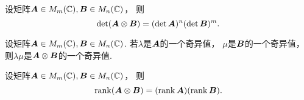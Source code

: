\begin{property}
设矩阵\(\boldsymbol{A} \in M_m(\mathbb{C}),
\boldsymbol{B} \in M_n(\mathbb{C})\)，
则\begin{equation}
	\det(
		\boldsymbol{A}\otimes\boldsymbol{B}
	)
	= (\det\boldsymbol{A})^n (\det\boldsymbol{B})^m.
\end{equation}
\end{property}

\begin{property}
设矩阵\(\boldsymbol{A} \in M_m(\mathbb{C}),
\boldsymbol{B} \in M_n(\mathbb{C})\).
若\(\lambda\)是\(\boldsymbol{A}\)的一个奇异值，
\(\mu\)是\(\boldsymbol{B}\)的一个奇异值，
则\(\lambda\mu\)是\(\boldsymbol{A}\otimes\boldsymbol{B}\)的一个奇异值.
\end{property}

\begin{property}
设矩阵\(\boldsymbol{A} \in M_m(\mathbb{C}),
\boldsymbol{B} \in M_n(\mathbb{C})\)，
则\begin{equation}
	\rank(
		\boldsymbol{A}\otimes\boldsymbol{B}
	)
	= (\rank\boldsymbol{A}) (\rank\boldsymbol{B}).
\end{equation}
\end{property}
